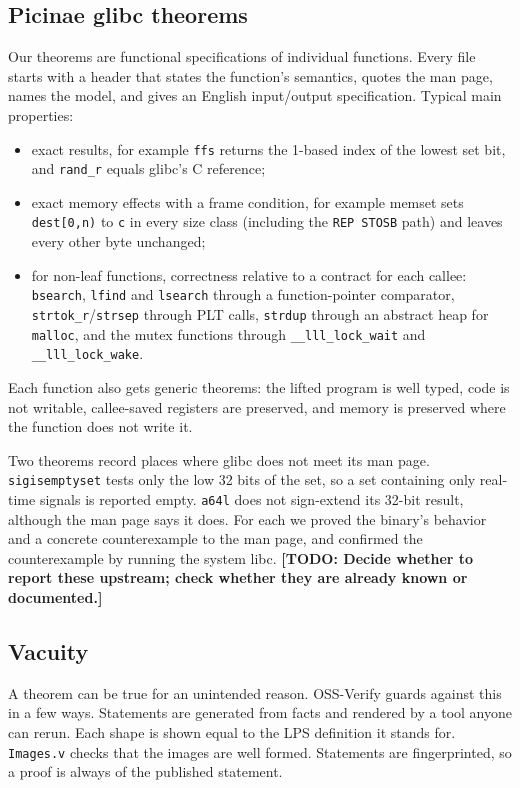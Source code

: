 \documentclass[11pt]{article}
\newcommand{\todo}[1]{\textbf{[TODO: #1]}}
\newcommand{\code}[1]{\texttt{#1}}
\begin{document}
\subsection{Picinae glibc theorems}

Our theorems are functional specifications of individual functions.  Every
file starts with a header that states the function's semantics, quotes the
man page, names the model, and gives an English input/output specification.
Typical main properties:
\begin{itemize}[nosep]
\item exact results, for example \code{ffs} returns the 1-based index of the
      lowest set bit, and \code{rand\_r} equals glibc's C reference;
\item exact memory effects with a frame condition, for example memset sets
      \code{dest[0,n)} to \code{c} in every size class (including the
      \code{REP STOSB} path) and leaves every other byte unchanged;
\item for non-leaf functions, correctness relative to a contract for each
      callee: \code{bsearch}, \code{lfind} and \code{lsearch} through a
      function-pointer comparator, \code{strtok\_r}/\code{strsep} through
      PLT calls, \code{strdup} through an abstract heap for \code{malloc},
      and the mutex functions through \code{\_\_lll\_lock\_wait} and
      \code{\_\_lll\_lock\_wake}.
\end{itemize}
Each function also gets generic theorems: the lifted program is well typed,
code is not writable, callee-saved registers are preserved, and memory is
preserved where the function does not write it.

Two theorems record places where glibc does not meet its man page.
\code{sigisemptyset} tests only the low 32 bits of the set, so a set
containing only real-time signals is reported empty.  \code{a64l} does not
sign-extend its 32-bit result, although the man page says it does.  For each
we proved the binary's behavior and a concrete counterexample to the man
page, and confirmed the counterexample by running the system libc.
\todo{Decide whether to report these upstream; check whether they are
already known or documented.}

\subsection{Vacuity}

A theorem can be true for an unintended reason.  OSS-Verify guards against
this in a few ways.  Statements are generated from facts and rendered by a
tool anyone can rerun.  Each shape is shown equal to the LPS definition it
stands for.  \code{Images.v} checks that the images are well formed.
Statements are fingerprinted, so a proof is always of the published
statement.
\end{document}
